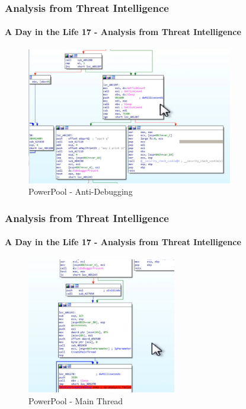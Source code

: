 \documentclass[aspectratio=169]{beamer}
\begin{document}
\begin{frame}
  \frametitle{Analysis from Threat Intelligence}
  \framesubtitle{A Day in the Life 17 - Analysis from Threat Intelligence}
  \begin{center}
    \begin{figure}
      \includegraphics[width=9cm,keepaspectratio]{powerpool_anti_debug}
      \caption{PowerPool - Anti-Debugging}
    \end{figure}
  \end{center}
\end{frame}

\begin{frame}
  \frametitle{Analysis from Threat Intelligence}
  \framesubtitle{A Day in the Life 17 - Analysis from Threat Intelligence}
  \begin{center}
    \begin{figure}
      \includegraphics[width=6.5cm,keepaspectratio]{powerpool_main_thread}
      \caption{PowerPool - Main Thread}
    \end{figure}
  \end{center}
\end{frame}
\end{document}
